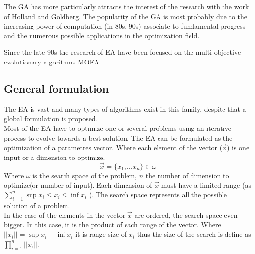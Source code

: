 The GA has more particularly attracts the interest of the research with the work of Holland and  Goldberg. The popularity of the GA is most probably due to the increasing power of computation (in 80s, 90s) associate to fundamental progress and the numerous possible applications in the optimization field.

Since the late 90s the research of EA have been focused on the multi objective evolutionary algorithms MOEA   \cite{75*zhou2011, 114*Zhang2007, 140*soremekun2001}. %



 


\subsection{General formulation}\label{sec:GeneralEAform}

 The EA is vast and many types of algorithms exist in this family, despite that a global formulation is proposed.\\
 Most of the EA have to optimize one or several problems using an iterative process to evolve towards a best solution. The EA can be formulated as the optimization of a parametres vector. Where each element of the vector ($\vec{x}$) is one input or a dimension to optimize. \begin{equation}
	\vec{x}= \{x_1,...x_n \} \in \omega
\end{equation}
Where $\omega$ is the search space of the problem, $n$ the number of dimension to optimize(or number of input). Each dimension of $\vec{x}$ must have a limited range (as $ \sum^{n}_{i=1} \sup x_i \leq x_i \leq \inf x_i$ ).  The search space represents all the possible solution of a problem. \\
In the case of the elements in the vector $\vec{x}$ are ordered, the search space even bigger. In this case, it is the product of each range of the vector.%
Where $||x_i||=\sup x_i -\inf x_i $ it is range size of  $x_i$ thus the size of the search is define as  $ \prod_{i=1}^{n} ||x_i||$. \\


